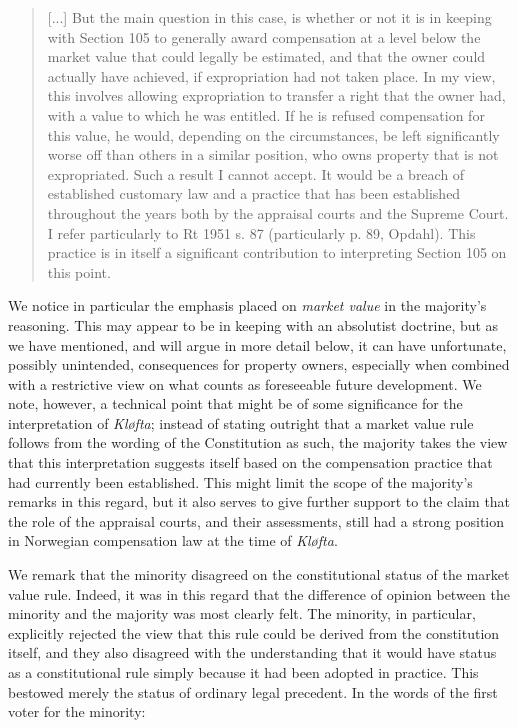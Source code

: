 \documentclass[10pt]{article} %
\begin{document}
\begin{quote}
[...] But the main question in this case, is whether or not it is in keeping with Section 105 to generally award compensation at a level below the market value that could legally be estimated, and that the owner could actually have achieved, if expropriation had not taken place. In my view, this involves allowing expropriation to transfer a right that the owner had, with a value to which he was entitled. If he is refused compensation for this value, he would, depending on the circumstances, be left significantly worse off than others in a similar position, who owns property that is not expropriated. Such a result I cannot accept. It would be a breach of established customary law and a practice that has been established throughout the years both by the appraisal courts and the Supreme Court. I refer particularly to Rt 1951 s. 87 (particularly p. 89, Opdahl). This practice is in itself a significant contribution to interpreting Section 105 on this point.
\end{quote}

We notice in particular the emphasis placed on \emph{market value} in the majority's reasoning. This may appear to be in keeping with an absolutist doctrine, but as we have mentioned, and will argue in more detail below, it can have unfortunate, possibly unintended, consequences for property owners, especially when combined with a restrictive view on what counts as foreseeable future development. We note, however, a technical point that might be of some significance for the interpretation of \emph{Kløfta}; instead of stating outright that a market value rule follows from the wording of the Constitution as such, the majority takes the view that this interpretation suggests itself based on the compensation practice that had currently been established. This might limit the scope of the majority's remarks in this regard, but it also serves to give further support to the claim that the role of the appraisal courts, and their assessments, still had a strong position in Norwegian compensation law at the time of \emph{Kløfta}. 

We remark that the minority disagreed on the constitutional status of the market value rule. Indeed, it was in this regard that the difference of opinion between the minority and the majority was most clearly felt. The minority, in particular, explicitly rejected the view that this rule could be derived from the constitution itself, and they also disagreed with the understanding that it would have status as a constitutional rule simply because it had been adopted in practice. This bestowed merely the status of ordinary legal precedent. In the words of the first voter for the minority:
\end{document}
